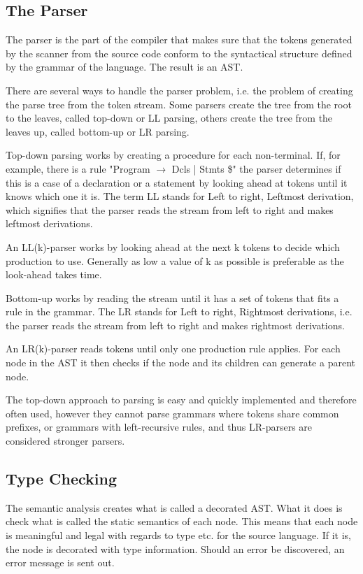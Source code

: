 \subsection{The Parser}

The parser is the part of the compiler that makes sure that the tokens generated by the scanner from the source code conform to the syntactical structure defined by the grammar of the language. The result is an AST. 

There are several ways to handle the parser problem, i.e. the problem of creating the parse tree from the token stream. Some parsers create the tree from the root to the leaves, called top-down or LL parsing, others create the tree from the leaves up, called bottom-up or LR parsing. 

Top-down parsing works by creating a procedure for each non-terminal. If, for example, there is a rule "Program $\rightarrow$ Dcls | Stmts \$" the parser determines if this is a case of a declaration or a statement by looking ahead at tokens until it knows which one it is. The term LL stands for Left to right, Leftmost derivation, which signifies that the parser reads the stream from left to right and makes leftmost derivations.

An LL(k)-parser works by looking ahead at the next k tokens to decide which production to use. Generally as low a value of k as possible is preferable as the look-ahead takes time. 

Bottom-up works by reading the stream until it has a set of tokens that fits a rule in the grammar. The LR stands for Left to right, Rightmost derivations, i.e. the parser reads the stream from left to right and makes rightmost derivations.

An LR(k)-parser reads tokens until only one production rule applies. For each node in the AST it then checks if the node and its children can generate a parent node.

The top-down approach to parsing is easy and quickly implemented and therefore often used, however they cannot parse grammars where tokens share common prefixes, or grammars with left-recursive rules, and thus LR-parsers are considered stronger parsers.

\subsection{Type Checking}

The semantic analysis creates what is called a decorated AST. What it does is check what is called the static semantics of each node. This means that each node is meaningful and legal with regards to type etc. for the source language. If it is, the node is decorated with  type information. Should an error be discovered, an error message is sent out. 


